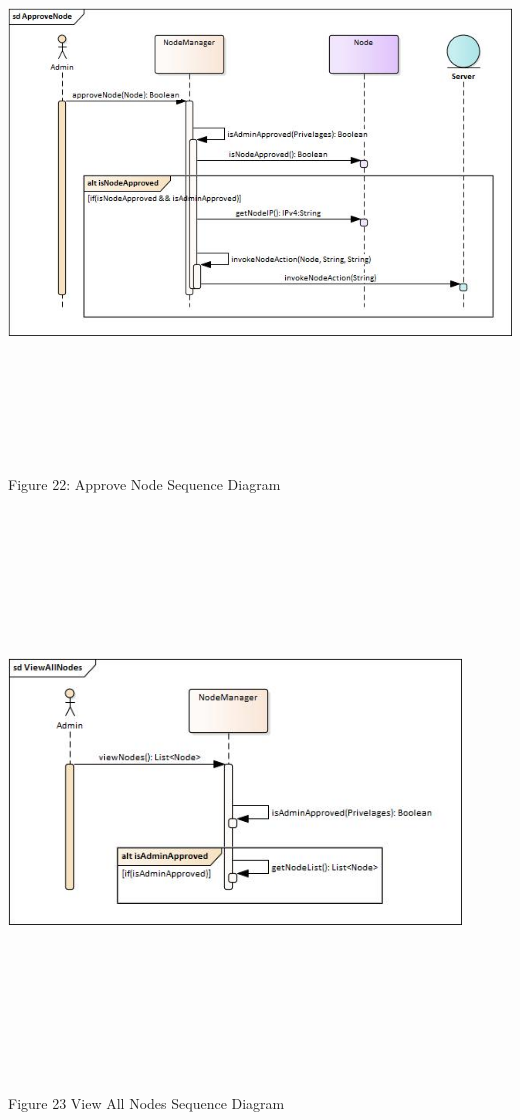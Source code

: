    \includegraphics[width=15cm,height=15cm,keepaspectratio]{admin_ui/images/sequence_diagrams/ApproveNode.jpg}
	\begin{center}
	    \small{Figure 22: Approve Node Sequence Diagram}
    \end{center}
    
    \includegraphics[width=12cm,height=15cm,keepaspectratio]{admin_ui/images/sequence_diagrams/ViewAllNodes.jpg}
	\begin{center}
	    \small{Figure 23 View All Nodes Sequence Diagram}
    \end{center}
    
